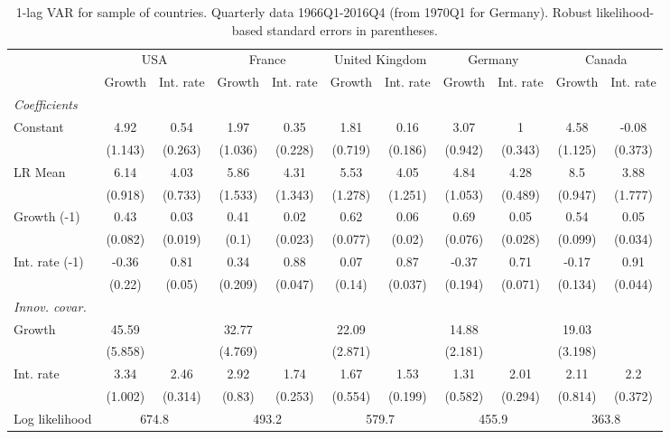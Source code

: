 \begin{table}[htbp] 
	\centering
	 \scriptsize
	\begin{tabular}{@{\extracolsep{4pt}}lcccccccccc@{}}		\hline\hline
		 		 & \multicolumn{2}{c}{USA} &\multicolumn{2}{c}{France} &\multicolumn{2}{c}{United Kingdom} &\multicolumn{2}{c}{Germany} &\multicolumn{2}{c}{Canada} \\ 
 		 & Growth 	 & Int. rate 	 & Growth 	 & Int. rate 	 & Growth 	 & Int. rate 	 & Growth 	 & Int. rate 	 & Growth 	 & Int. rate\\\cline{2-3}\cline{4-5}\cline{6-7}\cline{8-9}\cline{10-11}
\rule{0pt}{4ex} 
 \emph{Coefficients} 	  		 & 		 & 		 & 		 & 		 & 		 & 		 & 		 & 		 & 		 &\\ 
\quad Constant 	 & 4.92 	 & 0.54 	 & 1.97 	 & 0.35 	 & 1.81 	 & 0.16 	 & 3.07 	 & 1 	 & 4.58 	 & -0.08	 \\ 
 		 & (1.143) 	 & (0.263) 	 & (1.036) 	 & (0.228) 	 & (0.719) 	 & (0.186) 	 & (0.942) 	 & (0.343) 	 & (1.125) 	 & (0.373) 	 \\ 
\quad LR Mean 	 & 6.14 	 & 4.03 	 & 5.86 	 & 4.31 	 & 5.53 	 & 4.05 	 & 4.84 	 & 4.28 	 & 8.5 	 & 3.88	 \\ 
 		 & (0.918) 	 & (0.733) 	 & (1.533) 	 & (1.343) 	 & (1.278) 	 & (1.251) 	 & (1.053) 	 & (0.489) 	 & (0.947) 	 & (1.777) 	 \\ 
\quad Growth (-1) 	 &0.43 	 & 0.03 	 & 0.41 	 & 0.02 	 & 0.62 	 & 0.06 	 & 0.69 	 & 0.05 	 & 0.54 	 & 0.05	 \\ 
 		 & (0.082) 	 & (0.019) 	 & (0.1) 	 & (0.023) 	 & (0.077) 	 & (0.02) 	 & (0.076) 	 & (0.028) 	 & (0.099) 	 & (0.034) 	 \\ 
\quad Int. rate (-1) 	 &-0.36 	 & 0.81 	 & 0.34 	 & 0.88 	 & 0.07 	 & 0.87 	 & -0.37 	 & 0.71 	 & -0.17 	 & 0.91	 \\ 
 		 & (0.22) 	 & (0.05) 	 & (0.209) 	 & (0.047) 	 & (0.14) 	 & (0.037) 	 & (0.194) 	 & (0.071) 	 & (0.134) 	 & (0.044) 	 \\ 
\rule{0pt}{4ex} \emph{Innov. covar.}  	 & 	 & 	 & 	 & 	 & 	 & 	 & 	 & 	 & 	 &\\ 
\quad Growth 	 &45.59 	 &  	 & 32.77 	 &  	 & 22.09 	 &  	 & 14.88 	 &  	 & 19.03 	 & 	 \\ 
 		 & (5.858) 	 &  	 & (4.769) 	 &  	 & (2.871) 	 &  	 & (2.181) 	 &  	 & (3.198) 	 &  	 \\ 
\quad Int. rate 	 &3.34 	 & 2.46 	 & 2.92 	 & 1.74 	 & 1.67 	 & 1.53 	 & 1.31 	 & 2.01 	 & 2.11 	 & 2.2	 \\ 
 		 & (1.002) 	 & (0.314) 	 & (0.83) 	 & (0.253) 	 & (0.554) 	 & (0.199) 	 & (0.582) 	 & (0.294) 	 & (0.814) 	 & (0.372) 	 \\ 
 \hline \rule{0pt}{4ex} 
  Log likelihood 	 &\multicolumn{2}{c}{674.8} 	 & \multicolumn{2}{c}{493.2} 	 & \multicolumn{2}{c}{579.7} 	 & \multicolumn{2}{c}{455.9} 	 & \multicolumn{2}{c}{363.8}\\ 

 \hline 	\end{tabular}		\caption{1-lag VAR for sample of countries. Quarterly data 1966Q1-2016Q4
                      (from 1970Q1 for Germany). Robust likelihood-based
                      standard errors in parentheses.}
		\label{tab:all_1lag}

\end{table}
